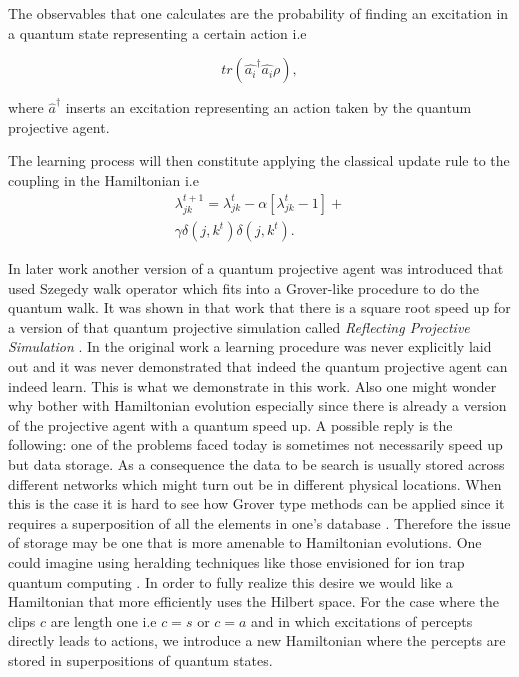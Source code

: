 \documentclass[twocolumn,prX,longbibliography]{revtex4}
\begin{document}
 The observables that one calculates are the probability of finding an excitation in a quantum state representing a certain action i.e
 
 \begin{equation}
 tr(\hat{a_i}^{\dagger}\hat{a_i}\rho),
 \end{equation}
 
 where \(\hat{a}^{\dagger} \) inserts an excitation representing an action taken by the quantum projective agent.
 
 The learning process will then constitute applying the classical update rule to the coupling in the Hamiltonian i.e
   \begin{equation}
   \begin{split}
       \lambda^{t+1}_{jk} =  \lambda^{t}_{jk} - \alpha[ \lambda^{t}_{jk}-1] +\\ \gamma \delta(j,k^t)\delta(j,k^t).
   \end{split} 
   \end{equation}
 
 In later work \cite{Paparo2014} another version of a quantum projective agent was introduced that used Szegedy walk operator \cite{Szegedy2004} which fits into a Grover-like procedure to do the quantum walk. It was shown in that work that there is a square root speed up for a version of that quantum projective simulation called  \textit{Reflecting Projective Simulation} . \newline
 In the original work a learning procedure was never explicitly laid out and it was never demonstrated that indeed the quantum projective agent can indeed learn. This is what we demonstrate in this work. \newline
 \indent Also one might wonder why bother with Hamiltonian evolution especially since there is already a version of the projective agent with a quantum speed up. A possible reply is the following: one of the problems faced today is sometimes not necessarily speed up but data storage. As a consequence the data to be search is usually stored across different networks which might turn out be in different physical locations. When this is the case it is hard to see how Grover type methods can be applied since it requires a superposition of all the elements in one's database \cite{Viamontes2005}. Therefore the issue of storage may be one that is more amenable to Hamiltonian evolutions. One could imagine using heralding techniques like those envisioned for ion trap quantum computing \cite{Brown2016}. \newline
 \indent In order to fully realize this desire we would like a Hamiltonian that more efficiently uses the Hilbert space. For the case where the clips \(c\) are length one i.e \(c = s\) or \(c=a \) and in which excitations of percepts directly leads to actions, we introduce a new Hamiltonian where the percepts are stored in superpositions of quantum states.  \newline
 
\end{document}
